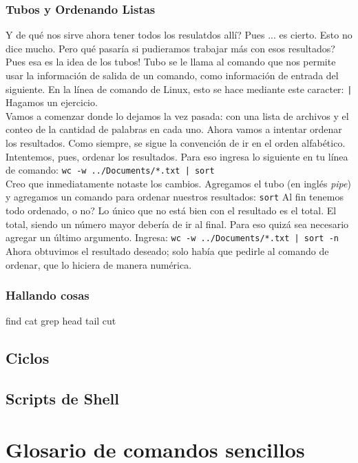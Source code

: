 \documentclass[10pt,letterpaper]{article}
\newcommand{\inlinecode}[1]{
\colorbox{light-gray}{\texttt{#1}}
}
\begin{document}
\subsubsection{Tubos y Ordenando Listas}
Y de qu\'e nos sirve ahora tener todos los resulatdos all\'i? Pues ... es cierto. Esto no dice mucho. Pero qu\'e pasar\'ia si pudieramos trabajar m\'as con esos resultados? Pues esa es la idea de los tubos! Tubo se le llama al comando que nos permite usar la informaci\'on de salida de un comando, como informaci\'on de entrada del siguiente. En la l\'inea de comando de Linux, esto se hace mediante este caracter: \inlinecode{|} Hagamos un ejercicio.\\

Vamos a comenzar donde lo dejamos la vez pasada: con una lista de archivos y el conteo de la cantidad de palabras en cada uno. Ahora vamos a intentar ordenar los resultados. Como siempre, se sigue la convenci\'on de ir en el orden alfab\'etico. Intentemos, pues, ordenar los resultados. Para eso ingresa lo siguiente en tu l\'inea de comando: \inlinecode{wc -w ../Documents/*.txt | sort}\\

Creo que inmediatamente notaste los cambios. Agregamos el tubo (en ingl\'es \emph{pipe}) y agregamos un comando para ordenar nuestros resultados: \inlinecode{sort} Al fin tenemos todo ordenado, o no? Lo \'unico que no est\'a bien con el resultado es el total. El total, siendo un n\'umero mayor deber\'ia de ir al final. Para eso quiz\'a sea necesario agregar un \'ultimo argumento. Ingresa: \inlinecode{wc -w ../Documents/*.txt | sort -n} Ahora obtuvimos el resultado deseado; solo hab\'ia que pedirle al comando de ordenar, que lo hiciera de manera num\'erica.

\subsubsection{Hallando cosas}
find
cat
grep
head
tail
cut

\subsection{Ciclos}
\subsection{Scripts de Shell}


\section{Glosario de comandos sencillos}
\end{document}
